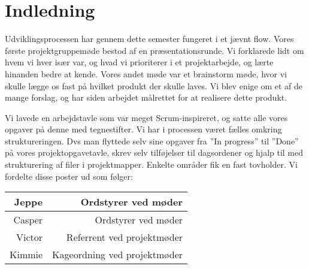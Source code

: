 \chapter{Indledning}

Udviklingsprocessen har gennem dette semester fungeret i et jævnt flow. Vores første projektgruppemøde bestod af en præsentationsrunde. Vi forklarede lidt om hvem vi hver især var, og hvad vi prioriterer i et projektarbejde, og lærte hinanden bedre at kende. Vores andet møde var et brainstorm møde, hvor vi skulle lægge os fast på hvilket produkt der skulle laves. Vi blev enige om et af de mange forslag, og har siden arbejdet målrettet for at realisere dette produkt.

Vi lavede en arbejdstavle som var meget Scrum-inspireret, og satte alle vores opgaver på denne med tegnestifter. 
Vi har i processen været fælles omkring struktureringen. Dvs man flyttede selv sine opgaver fra ”In progress” til ”Done” på vores projektopgavetavle, skrev selv tilføjelser til dagsordener og hjalp til med strukturering af filer i projektmapper. 
Enkelte områder fik en fast tovholder. Vi fordelte disse poster ud som følger:

\begin{table}[H] \centering
\begin{tabular}{|r|r|}
	\hline
		Jeppe & Ordstyrer ved møder \\ \hline
		Casper & Ordstyrer ved møder \\ \hline
		Victor & Referrent ved projektmøder \\ \hline
		Kimmie & Kageordning ved projektmøder \\ \hline
	\end{tabular}
\end{table}